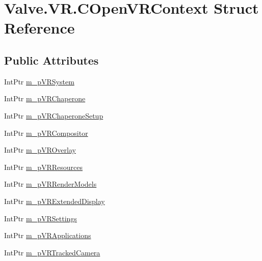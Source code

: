 \hypertarget{struct_valve_1_1_v_r_1_1_c_open_v_r_context}{}\section{Valve.\+V\+R.\+C\+Open\+V\+R\+Context Struct Reference}
\label{struct_valve_1_1_v_r_1_1_c_open_v_r_context}
\subsection*{Public Attributes}
\begin{DoxyCompactItemize}
\item 
Int\+Ptr \mbox{\hyperlink{struct_valve_1_1_v_r_1_1_c_open_v_r_context_aad81a7fb9bda8ce3bf3763302cce3d16}{m\+\_\+p\+V\+R\+System}}
\item 
Int\+Ptr \mbox{\hyperlink{struct_valve_1_1_v_r_1_1_c_open_v_r_context_a0d65653f2d13a0778deced4f8cb867bc}{m\+\_\+p\+V\+R\+Chaperone}}
\item 
Int\+Ptr \mbox{\hyperlink{struct_valve_1_1_v_r_1_1_c_open_v_r_context_a131cae8e0c97771c1db3048d09edc137}{m\+\_\+p\+V\+R\+Chaperone\+Setup}}
\item 
Int\+Ptr \mbox{\hyperlink{struct_valve_1_1_v_r_1_1_c_open_v_r_context_a1104759d6ed4d34321e1853f7ae675c2}{m\+\_\+p\+V\+R\+Compositor}}
\item 
Int\+Ptr \mbox{\hyperlink{struct_valve_1_1_v_r_1_1_c_open_v_r_context_a0f84670bf0cd3381a4cad423e8ec7e6a}{m\+\_\+p\+V\+R\+Overlay}}
\item 
Int\+Ptr \mbox{\hyperlink{struct_valve_1_1_v_r_1_1_c_open_v_r_context_a97ab39bf1ed0add79568298766fe87e9}{m\+\_\+p\+V\+R\+Resources}}
\item 
Int\+Ptr \mbox{\hyperlink{struct_valve_1_1_v_r_1_1_c_open_v_r_context_a7f967d48f53cb26d5be5637548ab5a2c}{m\+\_\+p\+V\+R\+Render\+Models}}
\item 
Int\+Ptr \mbox{\hyperlink{struct_valve_1_1_v_r_1_1_c_open_v_r_context_ab1dd2a329e04e193df3e50b63c48a761}{m\+\_\+p\+V\+R\+Extended\+Display}}
\item 
Int\+Ptr \mbox{\hyperlink{struct_valve_1_1_v_r_1_1_c_open_v_r_context_a5eceb2ec8d105d81d024fb1155d07aeb}{m\+\_\+p\+V\+R\+Settings}}
\item 
Int\+Ptr \mbox{\hyperlink{struct_valve_1_1_v_r_1_1_c_open_v_r_context_a3a2fddf032de06e7c7045fc8e3a28372}{m\+\_\+p\+V\+R\+Applications}}
\item 
Int\+Ptr \mbox{\hyperlink{struct_valve_1_1_v_r_1_1_c_open_v_r_context_a4d808e37e6b59b3394def53dab61a17b}{m\+\_\+p\+V\+R\+Tracked\+Camera}}

\end{DoxyCompactItemize}
